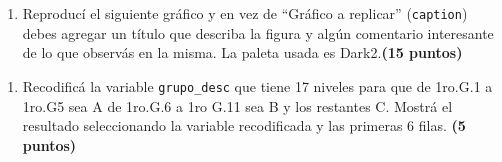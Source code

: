 \documentclass[
]{article}
\newenvironment{Shaded}{\begin{snugshade}}{\end{snugshade}}
\newcommand{\DataTypeTok}[1]{\textcolor[rgb]{0.13,0.29,0.53}{#1}}
\newcommand{\DecValTok}[1]{\textcolor[rgb]{0.00,0.00,0.81}{#1}}
\newcommand{\KeywordTok}[1]{\textcolor[rgb]{0.13,0.29,0.53}{\textbf{#1}}}
\newcommand{\NormalTok}[1]{#1}
\newcommand{\OperatorTok}[1]{\textcolor[rgb]{0.81,0.36,0.00}{\textbf{#1}}}
\newcommand{\StringTok}[1]{\textcolor[rgb]{0.31,0.60,0.02}{#1}}
\providecommand{\tightlist}{%
  \setlength{\itemsep}{0pt}\setlength{\parskip}{0pt}}
\begin{document}
\newpage

\begin{enumerate}
\def\labelenumi{\arabic{enumi}.}
\setcounter{enumi}{5}
\tightlist
\item
  Reproducí el siguiente gráfico y en vez de ``Gráfico a replicar''
  (\texttt{caption}) debes agregar un título que describa la figura y
  algún comentario interesante de lo que observás en la misma. La paleta
  usada es Dark2.\textbf{(15 puntos)}
\end{enumerate}

\begin{Shaded}
\end{Shaded}

\newpage

\begin{enumerate}
\def\labelenumi{\arabic{enumi}.}
\setcounter{enumi}{6}
\tightlist
\item
  Recodificá la variable \texttt{grupo\_desc} que tiene 17 niveles para
  que de 1ro.G.1 a 1ro.G5 sea A de 1ro.G.6 a 1ro G.11 sea B y los
  restantes C. Mostrá el resultado seleccionando la variable
  recodificada y las primeras 6 filas. \textbf{(5 puntos)}
\end{enumerate}
\end{document}
